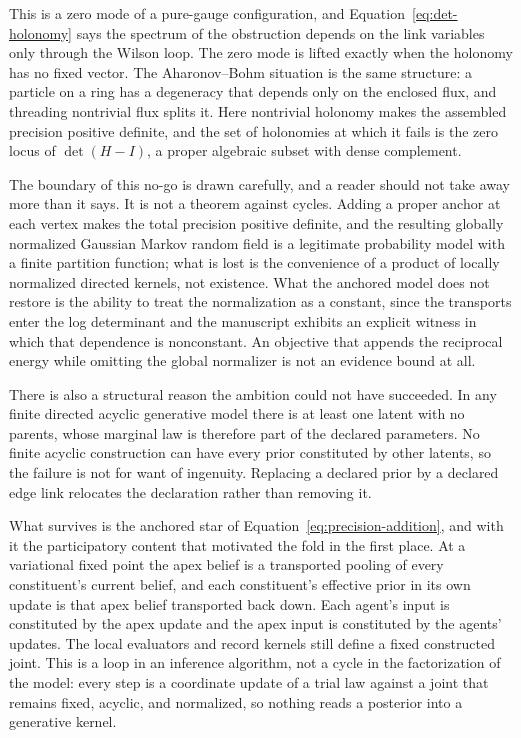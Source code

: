 \documentclass[11pt,letterpaper]{article}
\begin{document}
\begin{physicalreading}
This is a zero mode of a pure-gauge configuration, and Equation~\eqref{eq:det-holonomy} says the spectrum of the obstruction depends on the link variables only through the Wilson loop. The zero mode is lifted exactly when the holonomy has no fixed vector. The Aharonov--Bohm situation is the same structure: a particle on a ring has a degeneracy that depends only on the enclosed flux, and threading nontrivial flux splits it. Here nontrivial holonomy makes the assembled precision positive definite, and the set of holonomies at which it fails is the zero locus of \(\det(H-I)\), a proper algebraic subset with dense complement.
\end{physicalreading}

The boundary of this no-go is drawn carefully, and a reader should not take away more than it says. It is not a theorem against cycles. Adding a proper anchor at each vertex makes the total precision positive definite, and the resulting globally normalized Gaussian Markov random field is a legitimate probability model with a finite partition function; what is lost is the convenience of a product of locally normalized directed kernels, not existence. What the anchored model does not restore is the ability to treat the normalization as a constant, since the transports enter the log determinant and the manuscript exhibits an explicit witness in which that dependence is nonconstant. An objective that appends the reciprocal energy while omitting the global normalizer is not an evidence bound at all.

There is also a structural reason the ambition could not have succeeded. In any finite directed acyclic generative model there is at least one latent with no parents, whose marginal law is therefore part of the declared parameters. No finite acyclic construction can have every prior constituted by other latents, so the failure is not for want of ingenuity. Replacing a declared prior by a declared edge link relocates the declaration rather than removing it.

What survives is the anchored star of Equation~\eqref{eq:precision-addition}, and with it the participatory content that motivated the fold in the first place. At a variational fixed point the apex belief is a transported pooling of every constituent's current belief, and each constituent's effective prior in its own update is that apex belief transported back down. Each agent's input is constituted by the apex update and the apex input is constituted by the agents' updates. The local evaluators and record kernels still define a fixed constructed joint. This is a loop in an inference algorithm, not a cycle in the factorization of the model: every step is a coordinate update of a trial law against a joint that remains fixed, acyclic, and normalized, so nothing reads a posterior into a generative kernel.
\end{document}

